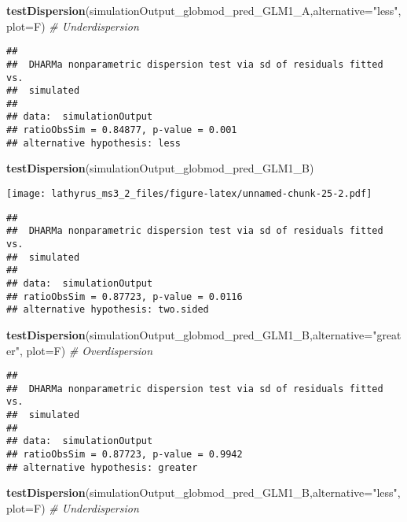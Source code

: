 \documentclass[
]{article}
\newenvironment{Shaded}{\begin{snugshade}}{\end{snugshade}}
\newcommand{\CommentTok}[1]{\textcolor[rgb]{0.56,0.35,0.01}{\textit{#1}}}
\newcommand{\DataTypeTok}[1]{\textcolor[rgb]{0.13,0.29,0.53}{#1}}
\newcommand{\KeywordTok}[1]{\textcolor[rgb]{0.13,0.29,0.53}{\textbf{#1}}}
\newcommand{\NormalTok}[1]{#1}
\newcommand{\StringTok}[1]{\textcolor[rgb]{0.31,0.60,0.02}{#1}}
\begin{document}
\begin{Shaded}
\begin{Highlighting}[]
\KeywordTok{testDispersion}\NormalTok{(simulationOutput_globmod_pred_GLM1_A,}\DataTypeTok{alternative=}\StringTok{"less"}\NormalTok{,}
               \DataTypeTok{plot=}\NormalTok{F) }\CommentTok{# Underdispersion}
\end{Highlighting}
\end{Shaded}

\begin{verbatim}
## 
##  DHARMa nonparametric dispersion test via sd of residuals fitted vs.
##  simulated
## 
## data:  simulationOutput
## ratioObsSim = 0.84877, p-value = 0.001
## alternative hypothesis: less
\end{verbatim}

\begin{Shaded}
\begin{Highlighting}[]
\KeywordTok{testDispersion}\NormalTok{(simulationOutput_globmod_pred_GLM1_B)}
\end{Highlighting}
\end{Shaded}

\texttt{[image: lathyrus\_ms3\_2\_files/figure-latex/unnamed-chunk-25-2.pdf]}

\begin{verbatim}
## 
##  DHARMa nonparametric dispersion test via sd of residuals fitted vs.
##  simulated
## 
## data:  simulationOutput
## ratioObsSim = 0.87723, p-value = 0.0116
## alternative hypothesis: two.sided
\end{verbatim}

\begin{Shaded}
\begin{Highlighting}[]
\KeywordTok{testDispersion}\NormalTok{(simulationOutput_globmod_pred_GLM1_B,}\DataTypeTok{alternative=}\StringTok{"greater"}\NormalTok{,}
               \DataTypeTok{plot=}\NormalTok{F) }\CommentTok{# Overdispersion}
\end{Highlighting}
\end{Shaded}

\begin{verbatim}
## 
##  DHARMa nonparametric dispersion test via sd of residuals fitted vs.
##  simulated
## 
## data:  simulationOutput
## ratioObsSim = 0.87723, p-value = 0.9942
## alternative hypothesis: greater
\end{verbatim}

\begin{Shaded}
\begin{Highlighting}[]
\KeywordTok{testDispersion}\NormalTok{(simulationOutput_globmod_pred_GLM1_B,}\DataTypeTok{alternative=}\StringTok{"less"}\NormalTok{,}
               \DataTypeTok{plot=}\NormalTok{F) }\CommentTok{# Underdispersion}
\end{Highlighting}
\end{Shaded}
\end{document}
